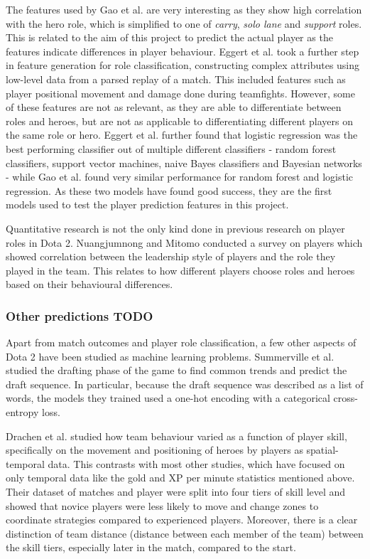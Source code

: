 \documentclass[Report.tex]{subfiles}
\begin{document}
The features used by Gao et al. are very interesting as they show high correlation with the hero role, which is simplified to one of \textit{carry}, \textit{solo lane} and \textit{support} roles. This is related to the aim of this project to predict the actual player as the features indicate differences in player behaviour. Eggert et al. \cite{dota-eggert} took a further step in feature generation for role classification, constructing complex attributes using low-level data from a parsed replay of a match. This included features such as player positional movement and damage done during teamfights. However, some of these features are not as relevant, as they are able to differentiate between roles and heroes, but are not as applicable to differentiating different players on the same role or hero. Eggert et al. \cite{dota-eggert} further found that logistic regression was the best performing classifier out of multiple different classifiers - random forest classifiers, support vector machines, naive Bayes classifiers and Bayesian networks - while Gao et al. \cite{dota-gao} found very similar performance for random forest and logistic regression. As these two models have found good success, they are the first models used to test the player prediction features in this project. 

Quantitative research is not the only kind done in previous research on player roles in Dota 2. Nuangjumnong and Mitomo \cite{dota-leadership} conducted a survey on players which showed correlation between the leadership style of players and the role they played in the team. This relates to how different players choose roles and heroes based on their behavioural differences. 

\subsubsection{Other predictions TODO}
Apart from match outcomes and player role classification, a few other aspects of Dota 2 have been studied as machine learning problems. Summerville et al. \cite{dota-draft} studied the drafting phase of the game to find common trends and predict the draft sequence. In particular, because the draft sequence was described as a list of words, the models they trained used a one-hot encoding with a categorical cross-entropy loss.

Drachen et al. \cite{dota-skill} studied how team behaviour varied as a function of player skill, specifically on the movement and positioning of heroes by players as spatial-temporal data. This contrasts with most other studies, which have focused on only temporal data like the gold and XP per minute statistics mentioned above. Their dataset of matches and player were split into four tiers of skill level and showed that novice players were less likely to move and change zones to coordinate strategies compared to experienced players. Moreover, there is a clear distinction of team distance (distance between each member of the team) between the skill tiers, especially later in the match, compared to the start.
\end{document}
